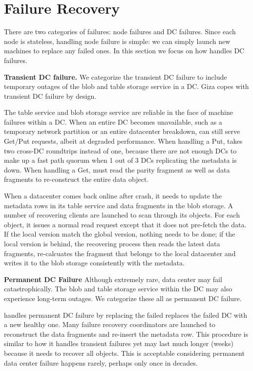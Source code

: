 \section{Failure Recovery}

There are two categories of failures: {\name} node failures and DC failures.
Since each \name node is stateless, handling node failure is simple: we can
simply launch new machines to replace any failed ones. In this section we focus
on how \name handles DC failures.

{\bf Transient DC failure.}
We categorize the transient DC failure to include temporary outages of the blob
and table storage service in a DC. Giza copes with transient DC failure by design.

The table service and blob storage service are reliable in the face of machine
failures within a DC.  When an entire DC becomes unavailable, such as a
temporary network partition or an entire datacenter breakdown, {\name} can still
serve Get/Put requests, albeit at degraded performance. When handling a Put,
\name takes two cross-DC roundtrips instead of one, because there are not enough
DCs to make up a fast path quorum when 1 out of 3 DCs replicating the metadata
is down. When handling a Get, \name must read the parity fragment as well as
data fragments to re-construct the entire data object.

When a datacenter comes back online after crash, it needs to update the metadata
rows in its table service and data fragments in the blob storage. A number of
recovering clients are launched to scan through its objects. For each object, it
issues a normal read request except that it does not pre-fetch the data. If the
local version match the global version, nothing needs to be done; if the local
version is behind, the recovering process then reads the latest data fragments,
re-calcuates the fragment that belongs to the local datacenter and writes it to
the blob storage consistently with the metadata.

{\bf Permanent DC Failure}
Although extremely rare, data center may fail catastrophically. The blob and
table storage service within the DC may also experience long-term outages. We
categorize these all as permanent DC failure. 

\name handles permanent DC failure by replacing the failed replaces the failed
DC with a new healthy one. Many failure recovery coordinators are launched to
reconstruct the data fragments and re-insert the metadata row. This procedure is
similar to how it handles transient failures yet may last much longer (weeks)
because it needs to recover all objects. This is acceptable considering
permanent data center failure happens rarely, perhaps only once in decades.

